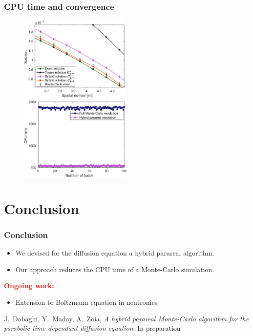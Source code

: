 \documentclass[10 pt]{beamer}
\begin{document}
\begin{frame}
  \frametitle{CPU time and convergence}
  \begin{figure}
\centering
\includegraphics[width=0.49\textwidth]{image/sol_k1_k2_zoom}
\includegraphics[width=0.5\textwidth]{image/CPU_time_trigo}
\end{figure}
\end{frame}
%
\section{Conclusion}
\begin{frame}
\frametitle{Conclusion}
\begin{itemize}
\item
We devised for the diffusion equation a hybrid parareal algorithm.
\vspace{0.3 cm}
\item Our approach reduces the CPU time of a Monte-Carlo simulation.
\end{itemize}
\vspace{0.5 cm}
\textcolor{red}{\textbf{Ongoing work:}}
\begin{itemize}
\item Extension to Boltzmann equation in neutronics
\end{itemize}
\vspace{0.5 cm}
\begin{thebibliography}{10}
 \scriptsize{
 {\sc J.~Dabaghi, Y.~Maday, A.~Zoia, {\em A hybrid parareal Monte-Carlo algorithm for the parabolic
time dependant diffusion equation}.
 \textcolor{black}{In preparation}}}
 \end{thebibliography}

\end{frame}
\end{document}
